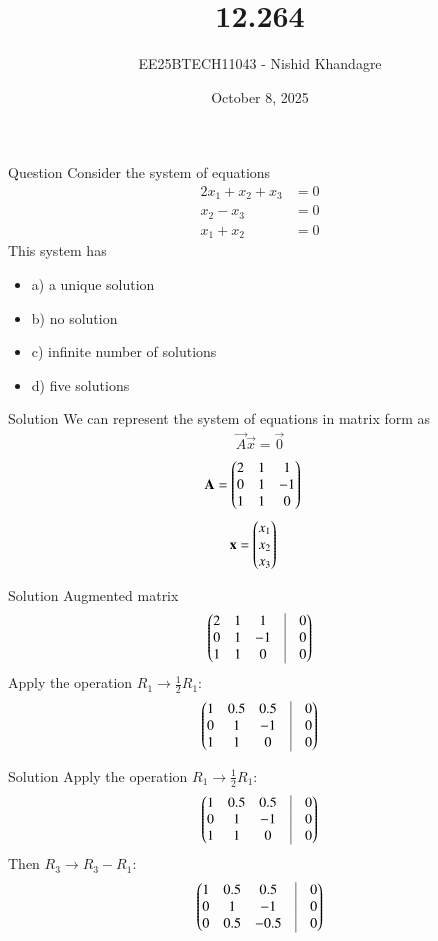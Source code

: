\documentclass{beamer}
\title{12.264}
\date{October 8, 2025}
\author{EE25BTECH11043 - Nishid Khandagre}
\begin{document}
\frame{\titlepage}

\begin{frame}{Question}
Consider the system of equations
\begin{align*}
2x_1 + x_2 + x_3 &= 0 \\
x_2 - x_3 &= 0 \\
x_1 + x_2 &= 0
\end{align*}
This system has
\begin{itemize}
\item a) a unique solution
\item b) no solution
\item c) infinite number of solutions
\item d) five solutions
\end{itemize}
\end{frame}

\begin{frame}{Solution}
We can represent the system of equations in matrix form as 
\begin{align}
\vec{A}\vec{x} = \vec{0}
\end{align}
\begin{align}
\mathbf{A} &= \begin{pmatrix}
2 & 1 & 1 \\
0 & 1 & -1 \\
1 & 1 & 0
\end{pmatrix}
\end{align}
\begin{align}
\mathbf{x} &= \begin{pmatrix}
x_1 \\ x_2 \\ x_3
\end{pmatrix}
\end{align}
\end{frame}

\begin{frame}{Solution}
Augmented matrix
\begin{align}
\myvec{
2 & 1 & 1 & \vrule & 0 \\
0 & 1 & -1 & \vrule & 0 \\
1 & 1 & 0 & \vrule & 0
}
\end{align}
Apply the operation $R_1 \rightarrow \frac{1}{2}R_1$:
\begin{align}
\myvec{
1 & 0.5 & 0.5 & \vrule & 0 \\
0 & 1 & -1 & \vrule & 0 \\
1 & 1 & 0 & \vrule & 0
}
\end{align}
\end{frame}

\begin{frame}{Solution}
Apply the operation $R_1 \rightarrow \frac{1}{2}R_1$:
\begin{align}
\myvec{
1 & 0.5 & 0.5 & \vrule & 0 \\
0 & 1 & -1 & \vrule & 0 \\
1 & 1 & 0 & \vrule & 0
}
\end{align}
Then $R_3 \rightarrow R_3 - R_1$:
\begin{align}
\myvec{
1 & 0.5 & 0.5 & \vrule & 0 \\
0 & 1 & -1 & \vrule & 0 \\
0 & 0.5 & -0.5 & \vrule & 0
}
\end{align}
\end{frame}
\end{document}
